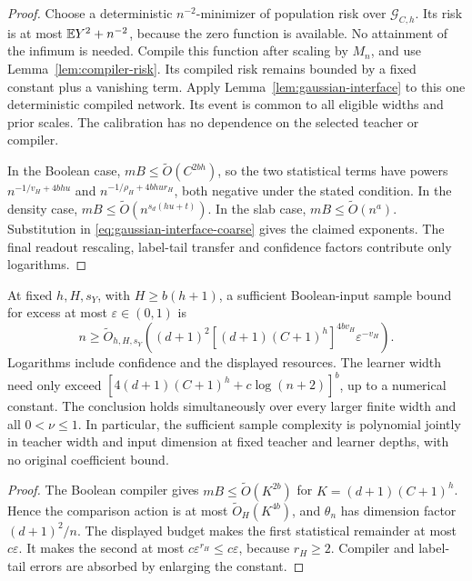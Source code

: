 \begin{proof}
Choose a deterministic $n^{-2}$-minimizer of population risk over
$\mathcal G_{C,h}$. Its risk is at most $\mathbb E Y^2+n^{-2}$, because the
zero function is available. No attainment of the infimum is needed.
Compile this function after scaling by $M_n$, and use
Lemma~\ref{lem:compiler-risk}. Its compiled risk remains bounded by a
fixed constant plus a vanishing term. Apply
Lemma~\ref{lem:gaussian-interface} to this one deterministic compiled
network. Its event is common to all eligible widths and prior scales.
The calibration has no dependence on the selected teacher or compiler.

In the Boolean case, $mB\le\widetilde O(C^{2bh})$, so the two
statistical terms have powers $n^{-1/v_H+4bhu}$ and
$n^{-1/\rho_H+4bhu r_H}$, both negative under the stated condition.
In the density case, $mB\le\widetilde O(n^{s_d(hu+t)})$.
In the slab case, $mB\le\widetilde O(n^a)$.
Substitution in \eqref{eq:gaussian-interface-coarse} gives the
claimed exponents. The final readout rescaling, label-tail transfer
and confidence factors contribute only logarithms.
\end{proof}

\begin{corollary}
\label{cor:boolean-samples}
At fixed $h,H,s_Y$, with $H\ge b(h+1)$, a sufficient Boolean-input
sample bound for excess at most $\varepsilon\in(0,1)$ is
\[
 n\ge\widetilde O_{h,H,s_Y}\left(
 (d+1)^2[(d+1)(C+1)^h]^{4b v_H}\varepsilon^{-v_H}\right).
\]
Logarithms include confidence and the displayed resources. The learner
width need only exceed
$[4(d+1)(C+1)^h+c\log(n+2)]^b$, up to a numerical constant. The
conclusion holds simultaneously over every larger finite width and
all $0<\nu\le1$. In particular, the sufficient sample complexity is
polynomial jointly in teacher width and input dimension at fixed
teacher and learner depths, with no original coefficient bound.
\end{corollary}
\begin{proof}
The Boolean compiler gives $mB\le\widetilde O(K^{2b})$ for
$K=(d+1)(C+1)^h$. Hence the comparison action is at most
$\widetilde O_H(K^{4b})$, and $\theta_n$ has dimension factor
$(d+1)^2/n$. The displayed budget makes the first statistical remainder
at most $c\varepsilon$. It makes the second at most
$c\varepsilon^{r_H}\le c\varepsilon$, because $r_H\ge2$.
Compiler and label-tail errors are absorbed by enlarging the constant.
\end{proof}

